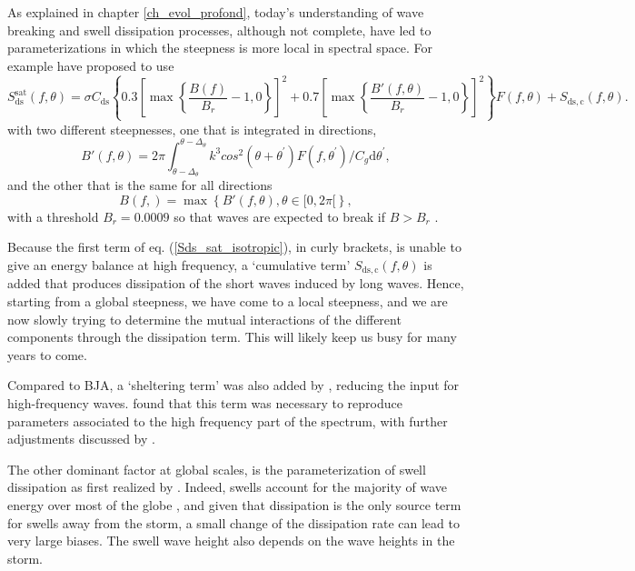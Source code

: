 As explained in chapter \ref{ch_evol_profond}, today's understanding of wave breaking and swell dissipation processes, 
although not complete, have led to parameterizations in which the steepness is more local in spectral space. 
For example \cite{Ardhuin&al.2010} have proposed to use 
\begin{equation}
S_{\mathrm{ds}}^{\mathrm{sat}} (f,\theta) =  \sigma
 C_{\mathrm{ds}} \left\{ 0.3
\left[\max\left\{\frac{B\left(f\right)}{B_r} -
1,0\right\}\right]^2  + 0.7
\left[\max\left\{\frac{B'\left(f,\theta \right)}{B_r} -1
 ,0\right\}\right]^2\right\}  F(f,\theta)  + S_{\mathrm{ds,c}}(f,\theta) \label{Sds_sat_isotropic}.
\end{equation}
with two different steepnesses, one that is integrated in directions, 
\begin{equation}
B'\left(f,\theta\right)=2 \pi
\int_{\theta-\Delta_\theta}^{\theta-\Delta_\theta} k^3
cos^2\left(\theta+ \theta^{\prime}\right) F(f,\theta^{\prime})/C_g
\mathrm d \theta^{\prime} \label{defBofkprime2},
\end{equation}
and the other that is the same for all directions
\begin{equation}
B\left(f,\right)=\max\left\{B'(f,\theta), \theta \in [0,2
\pi[\right\} \label{defBof},
\end{equation}
with a threshold $B_r = 0.0009$ so that waves are expected to break if 
$B > B_r$ \citep{Banner&al.2000,Banner&al.2002}.

Because the first term of eq. (\ref{Sds_sat_isotropic}), in curly brackets, is unable to give an energy balance 
at high frequency, a `cumulative term' $S_{\mathrm{ds,c}}(f,\theta)$ is added that produces dissipation of the short 
waves induced by long waves. Hence, starting from a global steepness, we have come to a local steepness, and we are now 
slowly trying to determine the mutual interactions of the different components through the dissipation term. This will 
likely keep us busy for many years to come. 

Compared to BJA, a `sheltering term' was also added by \cite{Banner&Morison2006,Banner&Morison2010}, reducing the 
input for high-frequency waves. \cite{Ardhuin&al.2008d} found that this term was necessary to reproduce parameters
associated to the high frequency part of the spectrum, with further adjustments discussed by \cite{Rascle&Ardhuin2013}.

The other dominant factor at global scales, is the parameterization of swell dissipation as first realized by 
\cite{Tolman2002e}. Indeed, swells account for the majority of wave energy over most of the globe \citep{Chen&al.2002}, 
and given that dissipation is the only source term for swells away from the storm, a small change of the dissipation rate
can lead to very large biases. The swell wave height also depends on the wave heights in the storm. 

